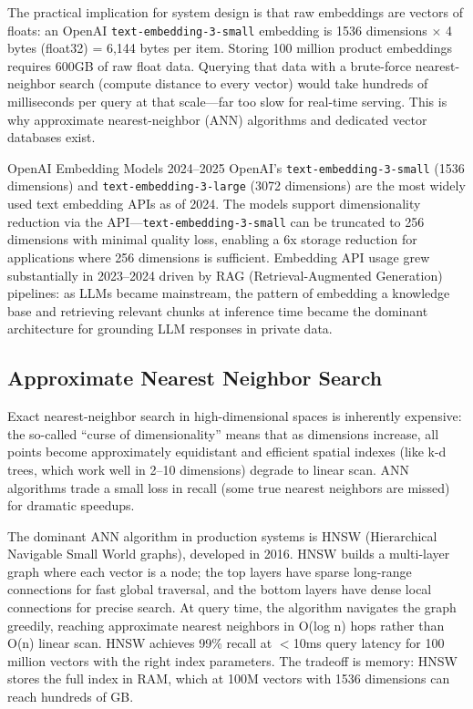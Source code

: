\documentclass[11pt,a4paper]{article}
\begin{document}
The practical implication for system design is that raw embeddings are vectors of floats: an OpenAI \texttt{text-embedding-3-small} embedding is 1536 dimensions $\times$ 4 bytes (float32) = 6,144 bytes per item. Storing 100 million product embeddings requires 600GB of raw float data. Querying that data with a brute-force nearest-neighbor search (compute distance to every vector) would take hundreds of milliseconds per query at that scale---far too slow for real-time serving. This is why approximate nearest-neighbor (ANN) algorithms and dedicated vector databases exist.

\begin{industrybox}{OpenAI Embedding Models 2024--2025}
OpenAI's \texttt{text-embedding-3-small} (1536 dimensions) and \texttt{text-embedding-3-large} (3072 dimensions) are the most widely used text embedding APIs as of 2024. The models support dimensionality reduction via the API---\texttt{text-embedding-3-small} can be truncated to 256 dimensions with minimal quality loss, enabling a 6x storage reduction for applications where 256 dimensions is sufficient. Embedding API usage grew substantially in 2023--2024 driven by RAG (Retrieval-Augmented Generation) pipelines: as LLMs became mainstream, the pattern of embedding a knowledge base and retrieving relevant chunks at inference time became the dominant architecture for grounding LLM responses in private data.
\end{industrybox}

\subsection{Approximate Nearest Neighbor Search}

Exact nearest-neighbor search in high-dimensional spaces is inherently expensive: the so-called ``curse of dimensionality'' means that as dimensions increase, all points become approximately equidistant and efficient spatial indexes (like k-d trees, which work well in 2--10 dimensions) degrade to linear scan. ANN algorithms trade a small loss in recall (some true nearest neighbors are missed) for dramatic speedups.

The dominant ANN algorithm in production systems is HNSW (Hierarchical Navigable Small World graphs), developed in 2016. HNSW builds a multi-layer graph where each vector is a node; the top layers have sparse long-range connections for fast global traversal, and the bottom layers have dense local connections for precise search. At query time, the algorithm navigates the graph greedily, reaching approximate nearest neighbors in O(log n) hops rather than O(n) linear scan. HNSW achieves 99\% recall at $<$10ms query latency for 100 million vectors with the right index parameters. The tradeoff is memory: HNSW stores the full index in RAM, which at 100M vectors with 1536 dimensions can reach hundreds of GB.
\end{document}
